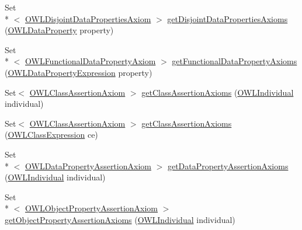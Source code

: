 \begin{DoxyCompactItemize}
\item 
Set\\*
$<$ \hyperlink{interfaceorg_1_1semanticweb_1_1owlapi_1_1model_1_1_o_w_l_disjoint_data_properties_axiom}{O\-W\-L\-Disjoint\-Data\-Properties\-Axiom} $>$ \hyperlink{interfaceorg_1_1semanticweb_1_1owlapi_1_1model_1_1_o_w_l_ontology_a9c501de3f5aa4e1634c6d4aca29b69fd}{get\-Disjoint\-Data\-Properties\-Axioms} (\hyperlink{interfaceorg_1_1semanticweb_1_1owlapi_1_1model_1_1_o_w_l_data_property}{O\-W\-L\-Data\-Property} property)
\item 
Set\\*
$<$ \hyperlink{interfaceorg_1_1semanticweb_1_1owlapi_1_1model_1_1_o_w_l_functional_data_property_axiom}{O\-W\-L\-Functional\-Data\-Property\-Axiom} $>$ \hyperlink{interfaceorg_1_1semanticweb_1_1owlapi_1_1model_1_1_o_w_l_ontology_a8a37f0a6d2535b6b613c5ab85714e8a0}{get\-Functional\-Data\-Property\-Axioms} (\hyperlink{interfaceorg_1_1semanticweb_1_1owlapi_1_1model_1_1_o_w_l_data_property_expression}{O\-W\-L\-Data\-Property\-Expression} property)
\item 
Set$<$ \hyperlink{interfaceorg_1_1semanticweb_1_1owlapi_1_1model_1_1_o_w_l_class_assertion_axiom}{O\-W\-L\-Class\-Assertion\-Axiom} $>$ \hyperlink{interfaceorg_1_1semanticweb_1_1owlapi_1_1model_1_1_o_w_l_ontology_af409eecd7a85f2c712376b159ada655a}{get\-Class\-Assertion\-Axioms} (\hyperlink{interfaceorg_1_1semanticweb_1_1owlapi_1_1model_1_1_o_w_l_individual}{O\-W\-L\-Individual} individual)
\item 
Set$<$ \hyperlink{interfaceorg_1_1semanticweb_1_1owlapi_1_1model_1_1_o_w_l_class_assertion_axiom}{O\-W\-L\-Class\-Assertion\-Axiom} $>$ \hyperlink{interfaceorg_1_1semanticweb_1_1owlapi_1_1model_1_1_o_w_l_ontology_af339b02d5734e8d3df473c6a5d647878}{get\-Class\-Assertion\-Axioms} (\hyperlink{interfaceorg_1_1semanticweb_1_1owlapi_1_1model_1_1_o_w_l_class_expression}{O\-W\-L\-Class\-Expression} ce)
\item 
Set\\*
$<$ \hyperlink{interfaceorg_1_1semanticweb_1_1owlapi_1_1model_1_1_o_w_l_data_property_assertion_axiom}{O\-W\-L\-Data\-Property\-Assertion\-Axiom} $>$ \hyperlink{interfaceorg_1_1semanticweb_1_1owlapi_1_1model_1_1_o_w_l_ontology_a2a97d9d2d72ef31c792c96f3f7551119}{get\-Data\-Property\-Assertion\-Axioms} (\hyperlink{interfaceorg_1_1semanticweb_1_1owlapi_1_1model_1_1_o_w_l_individual}{O\-W\-L\-Individual} individual)
\item 
Set\\*
$<$ \hyperlink{interfaceorg_1_1semanticweb_1_1owlapi_1_1model_1_1_o_w_l_object_property_assertion_axiom}{O\-W\-L\-Object\-Property\-Assertion\-Axiom} $>$ \hyperlink{interfaceorg_1_1semanticweb_1_1owlapi_1_1model_1_1_o_w_l_ontology_afdb401f95b75c41c59661f81ffeca4e9}{get\-Object\-Property\-Assertion\-Axioms} (\hyperlink{interfaceorg_1_1semanticweb_1_1owlapi_1_1model_1_1_o_w_l_individual}{O\-W\-L\-Individual} individual)

\end{DoxyCompactItemize}
